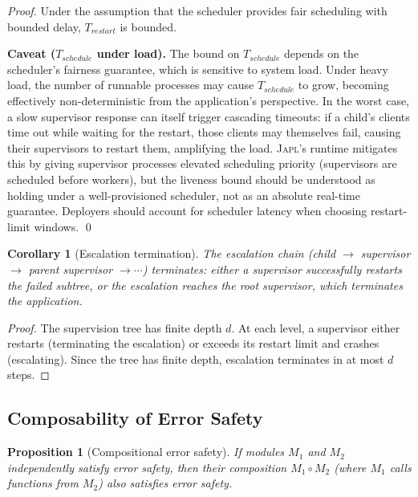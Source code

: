 \documentclass[11pt,twocolumn]{article}
\newtheorem{proposition}[theorem]{Proposition}
\newtheorem{corollary}[theorem]{Corollary}
\newcommand{\japl}{\textsc{Japl}}
\begin{document}
\begin{proof}
Under the assumption that the scheduler provides fair scheduling with bounded delay, $T_{\mathit{restart}}$ is bounded.

\textbf{Caveat ($T_{\mathit{schedule}}$ under load).} The bound on $T_{\mathit{schedule}}$ depends on the scheduler's fairness guarantee, which is sensitive to system load. Under heavy load, the number of runnable processes may cause $T_{\mathit{schedule}}$ to grow, becoming effectively non-deterministic from the application's perspective. In the worst case, a slow supervisor response can itself trigger cascading timeouts: if a child's clients time out while waiting for the restart, those clients may themselves fail, causing their supervisors to restart them, amplifying the load. \japl{}'s runtime mitigates this by giving supervisor processes elevated scheduling priority (supervisors are scheduled before workers), but the liveness bound should be understood as holding under a well-provisioned scheduler, not as an absolute real-time guarantee. Deployers should account for scheduler latency when choosing restart-limit windows. \qed
\end{proof}

\begin{corollary}[Escalation termination]
The escalation chain (child $\to$ supervisor $\to$ parent supervisor $\to \cdots$) terminates: either a supervisor successfully restarts the failed subtree, or the escalation reaches the root supervisor, which terminates the application.
\end{corollary}

\begin{proof}
The supervision tree has finite depth $d$. At each level, a supervisor either restarts (terminating the escalation) or exceeds its restart limit and crashes (escalating). Since the tree has finite depth, escalation terminates in at most $d$ steps.
\end{proof}

\subsection{Composability of Error Safety}

\begin{proposition}[Compositional error safety]
If modules $M_1$ and $M_2$ independently satisfy error safety, then their composition $M_1 \circ M_2$ (where $M_1$ calls functions from $M_2$) also satisfies error safety.
\end{proposition}
\end{document}
